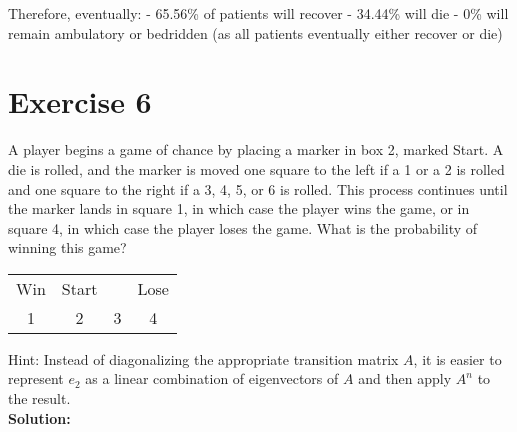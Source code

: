 \documentclass{article}
\begin{document}
Therefore, eventually:
- 65.56\% of patients will recover
- 34.44\% will die
- 0\% will remain ambulatory or bedridden (as all patients eventually either recover or die)

\newpage

\section*{Exercise 6}
A player begins a game of chance by placing a marker in box 2, marked Start. A die is rolled, and the marker is moved one square to the left if a 1 or a 2 is rolled and one square to the right if a 3, 4, 5, or 6 is rolled. This process continues until the marker lands in square 1, in which case the player wins the game, or in square 4, in which case the player loses the game. What is the probability of winning this game?

\begin{center}
\begin{tabular}{|c|c|c|c|}
\hline
Win & Start & & Lose \\
1 & 2 & 3 & 4 \\
\hline
\end{tabular}
\end{center}

Hint: Instead of diagonalizing the appropriate transition matrix $A$, it is easier to represent $e_2$ as a linear combination of eigenvectors of $A$ and then apply $A^n$ to the result. \\

\textbf{Solution:} \\
\end{document}
